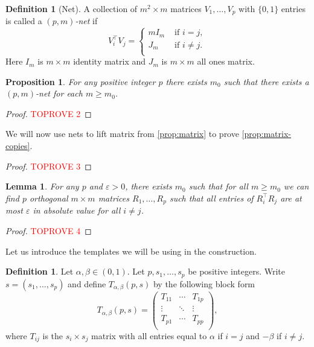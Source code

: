 \documentclass[reqno, 11pt]{amsart}
\newtheorem{proposition}[theorem]{Proposition}
\newtheorem{lemma}[theorem]{Lemma}
\theoremstyle{definition}
\newtheorem{definition}[theorem]{Definition}
\theoremstyle{remark}
\begin{document}
\begin{definition}[Net]\label{def:net}
A collection of $m^2 \times m$ matrices $V_1, \ldots, V_p$ with  $\{0,1\}$ entries is called a \emph{$(p,m)$-net} if
\[
    V_i^\intercal V_j = \begin{cases}
                            m I_m & \text{ if } i = j, \\
                            J_m   & \text{ if } i \neq j. \\
                         \end{cases}
\]
Here $I_m$ is $m\times m$ identity matrix and $J_m$ is $m\times m$ all ones matrix.
\end{definition}

\begin{proposition}\label{porp:net}
    For any positive integer $p$ there exists $m_0$ such that there exists a $(p,m)$-net for each $m \geq m_0$.
\end{proposition}
\begin{proof}\textcolor{red}{TOPROVE 2}\end{proof}

We will now use nets to lift matrix from \cref{prop:matrix} to prove \cref{prop:matrix-copies}.

\begin{proof}\textcolor{red}{TOPROVE 3}\end{proof}

\begin{lemma}\label{lem:matrix-copies}
    For any $p$ and $\varepsilon > 0$, there exists $m_0$ such that for all $m \geq m_0$ we can find $p$ orthogonal $m\times m$ matrices $R_1, \ldots, R_p$ such that  all entries of $R_i^\intercal R_j$ are at most $\varepsilon$ in absolute value for all $i \neq j$.
\end{lemma}
\begin{proof}\textcolor{red}{TOPROVE 4}\end{proof}

Let us introduce the templates we will be using in the construction.

\begin{definition}\label{def:uniform-template}
     Let $\alpha, \beta \in (0,1)$. Let $p, s_1, \ldots, s_p$ be positive integers. Write $s = (s_1,\ldots,s_p)$ and define $T_{\alpha, \beta}(p, s)$ by the following block form
         \[
        T_{\alpha, \beta}(p, s) = \begin{pmatrix}
            T_{11} & \cdots & T_{1p} \\
            \vdots & \ddots & \vdots \\
            T_{p1} & \cdots & T_{pp} \\
        \end{pmatrix},
    \]
    where $T_{ij}$ is the $s_i \times s_j$ matrix with all entries equal to $\alpha$ if $i = j$ and $-\beta$ if $i \neq j$. 
\end{definition}
\end{document}
